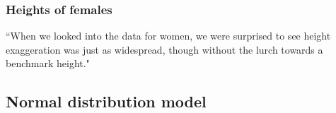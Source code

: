 \begin{frame}
\frametitle{Heights of females}

{
\pause
{\footnotesize ``When we looked into the data for women, we were surprised to see height exaggeration was just as widespread, though without the lurch towards a benchmark height."
}
}

\vfill


\end{frame}


\subsection{Normal distribution model}


